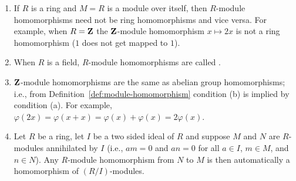     \begin{example}
        \phantom{a}
        \begin{enumerate}[label=(\arabic*)]
            \item If $R$ is a ring and $M=R$ is a module over itself, then $R$-module homomorphisms need not be ring homomorphisms and vice versa. For example, when $R = \mathbf{Z}$ the $\mathbf{Z}$-module homomorphism $x \mapsto 2x$ is not a ring homomorphism ($1$ does not get mapped to $1$).
            \item When $R$ is a field, $R$-module homomorphisms are called .
            \item $\mathbf{Z}$-module homomorphisms are the same as abelian group homomorphisms; i.e., from Definition~\ref{def:module-homomorphism} condition (b) is implied by condition (a). For example, $\varphi(2x) = \varphi(x + x) = \varphi(x) + \varphi(x) = 2\varphi(x)$.
            \item Let $R$ be a ring, let $I$ be a two sided ideal of $R$ and suppose $M$ and $N$ are $R$-modules annihilated by $I$ (i.e., $am=0$ and $an=0$ for all $a \in I$, $m \in M$, and $n \in N$). Any $R$-module homomorphism from $N$ to $M$ is then automatically a homomorphism of $(R/I)$-modules.
        \end{enumerate}
    \end{example}

